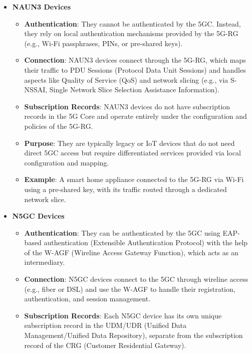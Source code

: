 \begin{itemize}
    \item {
        \textbf{NAUN3 Devices}
        \begin{itemize}
            \item {
                \textbf{Authentication}: They cannot be authenticated by the 5GC. Instead, they rely on local authentication mechanisms provided by the 5G-RG (e.g., Wi-Fi passphrases, PINs, or pre-shared keys).
            }
            \item {
                \textbf{Connection}: NAUN3 devices connect through the 5G-RG, which maps their traffic to PDU Sessions (Protocol Data Unit Sessions) and handles aspects like Quality of Service (QoS) and network slicing (e.g., via S-NSSAI, Single Network Slice Selection Assistance Information).
            }
            \item {
                \textbf{Subscription Records}: NAUN3 devices do not have subscription records in the 5G Core and operate entirely under the configuration and policies of the 5G-RG.
            }
            \item {
                \textbf{Purpose}: They are typically legacy or IoT devices that do not need direct 5GC access but require differentiated services provided via local configuration and mapping.
            }
            \item {
                \textbf{Example}: A smart home appliance connected to the 5G-RG via Wi-Fi using a pre-shared key, with its traffic routed through a dedicated network slice.
            }
        \end{itemize}    
    }
    \item {
        \textbf{N5GC Devices}
        \begin{itemize}
            \item {
                \textbf{Authentication}: They can be authenticated by the 5GC using EAP-based authentication (Extensible Authentication Protocol) with the help of the W-AGF (Wireline Access Gateway Function), which acts as an intermediary.
            }
            \item {
                \textbf{Connection}: N5GC devices connect to the 5GC through wireline access (e.g., fiber or DSL) and use the W-AGF to handle their registration, authentication, and session management.
            }
            \item {
                \textbf{Subscription Records}: Each N5GC device has its own unique subscription record in the UDM/UDR (Unified Data Management/Unified Data Repository), separate from the subscription record of the CRG (Customer Residential Gateway).
}
\end{itemize}}
\end{itemize}
